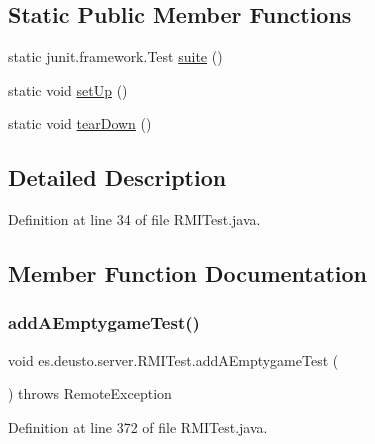 \subsection*{Static Public Member Functions}
\begin{DoxyCompactItemize}
\item 
static junit.\+framework.\+Test \hyperlink{classes_1_1deusto_1_1server_1_1_r_m_i_test_aa7e6688b24d65fd77edadd24a4c93c97}{suite} ()
\item 
static void \hyperlink{classes_1_1deusto_1_1server_1_1_r_m_i_test_a2cd940f51ed95fb8cc3676df31fc84ea}{set\+Up} ()
\item 
static void \hyperlink{classes_1_1deusto_1_1server_1_1_r_m_i_test_a069a29652068120e6807a325863d09aa}{tear\+Down} ()
\end{DoxyCompactItemize}


\subsection{Detailed Description}


Definition at line 34 of file R\+M\+I\+Test.\+java.



\subsection{Member Function Documentation}
\mbox{\label{classes_1_1deusto_1_1server_1_1_r_m_i_test_ae30d264c095cf976eded0973af19cffe}} 
\subsubsection{\texorpdfstring{add\+A\+Emptygame\+Test()}{addAEmptygameTest()}}
{\footnotesize\ttfamily void es.\+deusto.\+server.\+R\+M\+I\+Test.\+add\+A\+Emptygame\+Test (\begin{DoxyParamCaption}{ }\end{DoxyParamCaption}) throws Remote\+Exception}



Definition at line 372 of file R\+M\+I\+Test.\+java.

\mbox{\label{classes_1_1deusto_1_1server_1_1_r_m_i_test_a2af4f64232d4c4ce2e0fcfe788ae7c72}} 
